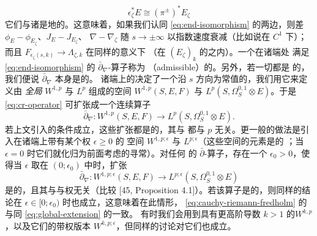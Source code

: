 \begin{equation}\label{eq:end-isomorphism}
\epsilon_\zeta^*E\cong(\pi^\pm)^*E_\zeta
\end{equation}
它们与诸\trLimitingDatum{}是\trAsymptotic{}地\trCompatible{}的。这意味着，如果我们认同
\eqref{eq:end-isomorphism} 的两边，则差 $\phi_E-\phi_{E_\zeta}$、$J_E-J_{E_\zeta}$、
$\nabla-\nabla_\zeta$ 随 $s\to\pm\infty$ 以指数速度衰减（比如说在 $C^1$
\trTopology{}下）；而且 $F_{\epsilon_\zeta(s,k)}\to\Lambda_{\zeta,k}$ 在同样的意义下%
\trConvergence（在 $(E_\zeta)_k$ 的\trLagrangianGrassmannian{}之内）。一个在诸端处
满足\eqref{eq:end-isomorphism} 的 $\bar\partial_\nabla$-算子称为%
\textbf{\trAdmissible}（admissible）的。另外，若一切\trLimitingDatum{}都是%
\trNondegenerate{}的，我们便说 $\bar\partial_\nabla$ 本身是\trNondegenerate{}的。
诸端上的\trTrivialization{}决定了一个沿 $s$ 方向为常值的\trMetric，我们用它来定义由
\emph{全局} $W^{1,p}$ 与 $L^p$ \trSection{}组成的空间 $W^{1,p}(S,E,F)$ 与
$L^p(S,\Omega^{0,1}_S\otimes E)$。于是\eqref{eq:cr-operator} 可扩张成一个连续算子
\begin{equation}\label{eq:global-extension}
\bar\partial_\nabla\colon W^{1,p}(S,E,F)
\longrightarrow L^p(S,\Omega^{0,1}_S\otimes E).
\end{equation}
若上文引入的\trNondegenerate{}条件成立，这些扩张都是\trFredholm{}的，其\trKernel{}与%
\trCokernel{}都与 $p$ 无关。更一般的做法是引入在诸端上带有某个权 $\epsilon\ge0$ 的
空间 $W^{1,p;\epsilon}$ 与 $L^{p;\epsilon}$（这些空间的元素是\trExponentialDecay{}的%
\trSection；当 $\epsilon=0$ 时它们就化归为前面考虑的寻常\trSobolevSpace）。对任何%
\trAdmissible{}的 $\bar\partial$-算子，存在一个 $\epsilon_0>0$，使得当 $\epsilon$ 取在
$(0;\epsilon_0)$ 中时，扩张
\begin{equation}\label{eq:cauchy-riemann-fredholm}
\bar\partial_\nabla\colon W^{1,p;\epsilon}(S,E,F)
\longrightarrow L^{p;\epsilon}(S,\Omega^{0,1}_S\otimes E)
\end{equation}
是\trFredholm{}的，且其\trKernel{}与\trCokernel{}与权无关（比较 [45, Proposition
4.1]）。若该\trCauchyRiemann{}算子是\trNondegenerate{}的，则同样的结论在
$\epsilon\in[0;\epsilon_0)$ 时也成立，这意味着在此情形，%
\eqref{eq:cauchy-riemann-fredholm} 的\trKernel{}与\trCokernel{}同
\eqref{eq:global-extension} 的一致。
有时我们会用到具有更高阶导数 $k>1$ 的\trSobolevSpace{}$W^{k,p}$，以及它们的带权版本
$W^{k,p;\epsilon}$，但同样的讨论对它们也成立。
